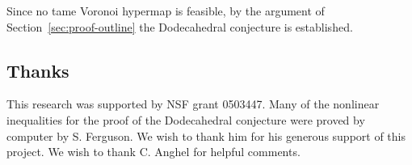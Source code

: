 \documentclass{article} %
\begin{document}
Since no tame Voronoi hypermap is feasible, by the argument of
Section~\ref{sec:proof-outline} the Dodecahedral conjecture is
established.

\subsection*{Thanks}

This research was supported by NSF grant 0503447. Many of the
nonlinear inequalities for the proof of the Dodecahedral conjecture
were proved by computer by S. Ferguson. We wish to thank him for his
generous support of this project. We wish to thank C. Anghel for
helpful comments.





\end{document}
